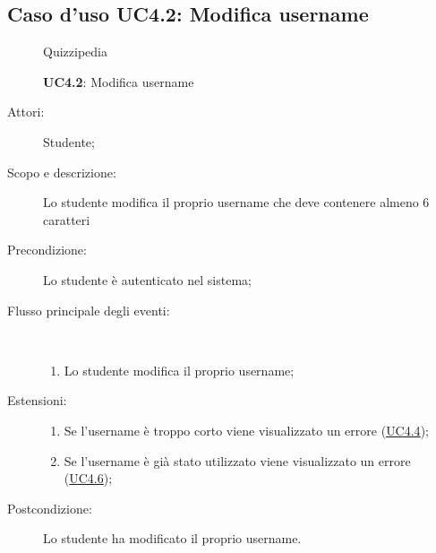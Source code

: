 \subsection{Caso d'uso UC4.2: Modifica username}
\begin{figure}[H]
	\centering
	\begin{resizedtikzpicture}{\textwidth}
		\begin{umlsystem}[x=0, fill=lightgray!20]{Quizzipedia}
		\end{umlsystem}
	\end{resizedtikzpicture}
	\caption{\textbf{UC4.2}: Modifica username}
	\label{UC4.2}
\end{figure}
\begin{description}
	\item[Attori:] Studente;
	\item[Scopo e descrizione:] Lo studente modifica il proprio username che deve contenere almeno 6 caratteri
	\item[Precondizione:] Lo studente è autenticato nel sistema;
	
	\item[Flusso principale degli eventi:] \ 
	\begin{enumerate}
		\item Lo studente modifica il proprio username;
		
	\end{enumerate}
	\item[Estensioni:]
	\begin{enumerate}
		\item Se l'username è troppo corto viene visualizzato un errore (\hyperlink{UC4.4}{UC4.4});
		\item Se l'username è già stato utilizzato viene visualizzato un errore (\hyperlink{UC4.6}{UC4.6});
		
	\end{enumerate}
	\item[Postcondizione:] Lo studente ha modificato il proprio username.
\end{description}
\hypertarget{UC4.3}{}

